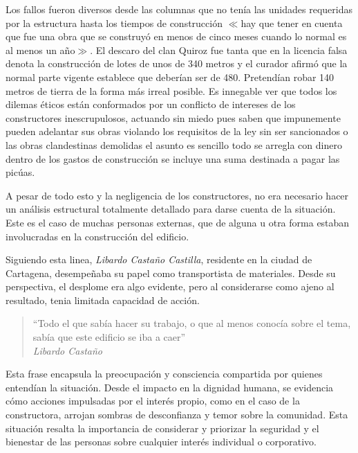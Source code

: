 \documentclass[letterpaper, 12pt]{article}
\renewcommand{\comment}[1]{{\small $\ll$#1$\gg$}}
\begin{document}

Los fallos fueron diversos desde las columnas que no tenía
las unidades requeridas por la estructura hasta los tiempos
de construcción \comment{hay que tener en cuenta que fue
una obra que se construyó en menos de cinco meses cuando lo
normal es al menos un año}. El descaro del clan Quiroz fue
tanta que en la licencia falsa denota la construcción de
lotes de unos de 340 metros y el curador afirmó que la
normal parte vigente establece que deberían ser de 480.
Pretendían robar 140 metros de tierra de la forma más
irreal posible. Es innegable ver que todos los dilemas
éticos están conformados por un conflicto de intereses de
los constructores inescrupulosos, actuando sin miedo pues
saben que impunemente pueden adelantar sus obras violando
los requisitos de la ley sin ser sancionados o las obras
clandestinas demolidas el asunto es sencillo todo se
arregla con dinero dentro de los gastos de construcción se
incluye una suma destinada a pagar las picúas.


A pesar de todo esto y la negligencia de los constructores,
no era necesario hacer un análisis estructural totalmente
detallado para darse cuenta de la situación. Este es el
caso de muchas personas externas, que de alguna u otra
forma estaban involucradas en la construcción del edificio.

Siguiendo esta linea, \textit{Libardo Castaño Castilla},
residente en la ciudad de Cartagena, desempeñaba su papel
como transportista de materiales. Desde su perspectiva, el
desplome era algo evidente, pero al considerarse como ajeno
al resultado, tenia limitada capacidad de acción.

\begin{quote}
      ``Todo el que sabía hacer su trabajo, o que al menos conocía
      sobre el tema, sabía que este edificio se iba a caer'' \\
      \textit{Libardo Castaño}
\end{quote}

Esta frase encapsula la preocupación y consciencia
compartida por quienes entendían la situación. Desde el
impacto en la dignidad humana, se evidencia cómo acciones
impulsadas por el interés propio, como en el caso de la
constructora, arrojan sombras de desconfianza y temor sobre
la comunidad. Esta situación resalta la importancia de
considerar y priorizar la seguridad y el bienestar de las
personas sobre cualquier interés individual o corporativo.
\end{document}
